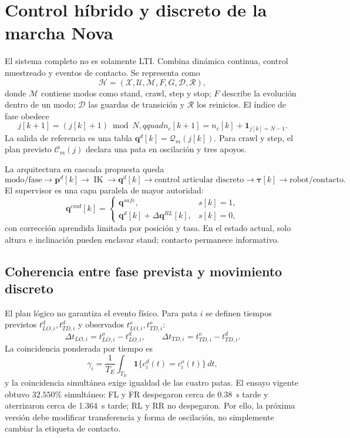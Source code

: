 \documentclass[11pt,letterpaper]{article}
\newcommand{\vect}[1]{\bm{#1}}
\newcommand{\IK}{\operatorname{IK}}
\begin{document}
\section{Control híbrido y discreto de la marcha Nova}
El sistema completo no es solamente LTI. Combina dinámica continua, control
muestreado y eventos de contacto. Se representa como
\begin{equation}
 \mathcal H=(\mathcal X,\mathcal U,\mathcal M,F,G,\mathcal D,\mathcal R),
\end{equation}
donde $\mathcal M$ contiene modos como stand, crawl, step y stop; $F$ describe
la evolución dentro de un modo; $\mathcal D$ las guardas de transición y
$\mathcal R$ los reinicios. El índice de fase obedece
\begin{equation}
 j[k+1]=(j[k]+1)\bmod N,qquad
 n_c[k+1]=n_c[k]+\mathbf 1_{j[k]=N-1}.
\end{equation}
La salida de referencia es una tabla
$\vect q^d[k]=\mathcal Q_m(j[k])$. Para crawl y step, el plan previsto
$\mathcal C_m(j)$ declara una pata en oscilación y tres apoyos.

La arquitectura en cascada propuesta queda
\begin{equation}
 \text{modo/fase}\rightarrow\vect p^d[k]\rightarrow\IK
 \rightarrow\vect q^d[k]\rightarrow
 \text{control articular discreto}\rightarrow\vect\tau[k]
 \rightarrow\text{robot/contacto}.
 \label{eq:cascade}
\end{equation}
El supervisor es una capa paralela de mayor autoridad:
\begin{equation}
 \vect q^{cmd}[k]=
 \begin{cases}
 \vect q^{safe},&s[k]=1,\\
 \vect q^d[k]+\Delta\vect q^{RL}[k],&s[k]=0,
 \end{cases}
\end{equation}
con corrección aprendida limitada por posición y tasa. En el estado actual,
solo altura e inclinación pueden enclavar stand; contacto permanece informativo.

\subsection{Coherencia entre fase prevista y movimiento discreto}
El plan lógico no garantiza el evento físico. Para pata $i$ se definen tiempos
previstos $t_{LO,i}^d,t_{TD,i}^d$ y observados
$t_{LO,i}^o,t_{TD,i}^o$:
\begin{equation}
 \Delta t_{LO,i}=t_{LO,i}^o-t_{LO,i}^d,\qquad
 \Delta t_{TD,i}=t_{TD,i}^o-t_{TD,i}^d.
\end{equation}
La coincidencia ponderada por tiempo es
\begin{equation}
 \gamma_i=\frac{1}{T_E}\int_{T_E}
 \mathbf 1\{c_i^d(t)=c_i^o(t)\}\,dt,
\end{equation}
y la coincidencia simultánea exige igualdad de las cuatro patas. El ensayo
vigente obtuvo $32.550\%$ simultáneo: FL y FR despegaron cerca de
\SI{0.38}{s} tarde y aterrizaron cerca de \SI{1.364}{s} tarde; RL y RR no
despegaron. Por ello, la próxima versión debe modificar transferencia y forma
de oscilación, no simplemente cambiar la etiqueta de contacto.
\end{document}
